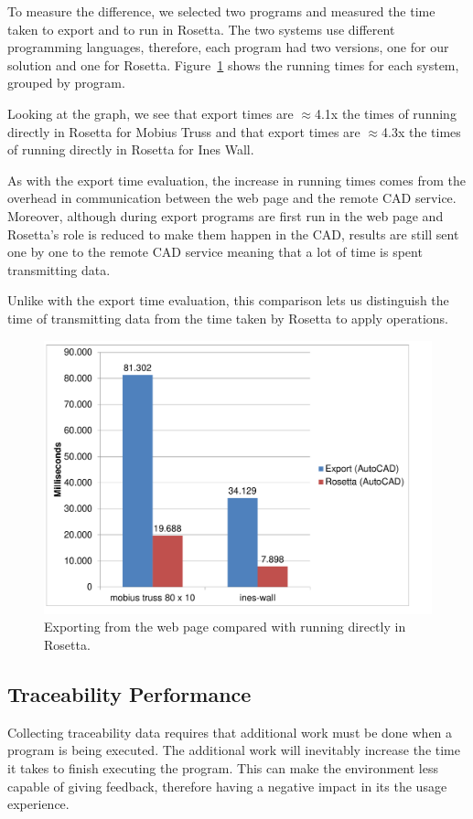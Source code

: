 To measure the difference, we selected two programs and measured the time taken to export and to run in Rosetta.
The two systems use different programming languages, therefore, each program had two versions, one for our solution and one for Rosetta.
Figure~\ref{fig:export:vs:rosetta} shows the running times for each system, grouped by program.

Looking at the graph, we see that export times are $\approx$4.1x the times of running directly in Rosetta for Mobius Truss and that export times are $\approx$4.3x the times of running directly in Rosetta for Ines Wall.

As with the export time evaluation, the increase in running times comes from the overhead in communication between the web page and the remote CAD service.
Moreover, although during export programs are first run in the web page and Rosetta's role is reduced to make them happen in the CAD, results are still sent one by one to the remote CAD service meaning that a lot of time is spent transmitting data.

Unlike with the export time evaluation, this comparison lets us distinguish the time of transmitting data from the time taken by Rosetta to apply operations.

\begin{figure}
  \centering
  \includegraphics[width=12cm]{./images/export_vs_rosetta_chart}
  \caption{Exporting from the web page compared with running directly in Rosetta.}
  \label{fig:export:vs:rosetta}
\end{figure}


\subsection{Traceability Performance}
Collecting traceability data requires that additional work must be done when a program is being executed.
The additional work will inevitably increase the time it takes to finish executing the program.
This can make the environment less capable of giving feedback, therefore having a negative impact in its the usage experience.

